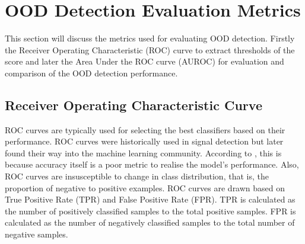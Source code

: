 \section{OOD Detection Evaluation Metrics}
This section will discuss the metrics used for evaluating OOD detection. Firstly the Receiver Operating Characteristic (ROC) curve to extract thresholds of the score and later the Area Under the ROC curve (AUROC) for evaluation and comparison of the OOD detection performance.
\subsection{Receiver Operating Characteristic Curve}
ROC curves are typically used for selecting the best classifiers based on their performance.
ROC curves were historically used in signal detection but later found their way into the machine learning community.
According to \cite{ROC_example}, this is because accuracy itself is a poor metric to realise the model's performance.
Also, ROC curves are insusceptible to change in class distribution, that is, the proportion of negative to positive examples.
ROC curves are drawn based on True Positive Rate (TPR) and False Positive Rate (FPR).
TPR is calculated as the number of positively classified samples to the total positive samples. FPR is calculated as the number of negatively classified samples to the total number of negative samples.

